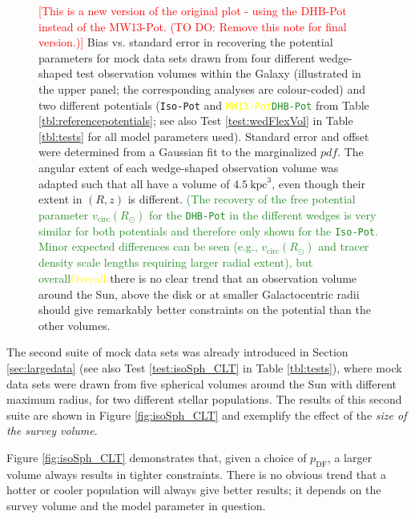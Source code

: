 \documentclass[iop,revtex4,numberedappendix,appendixfloats]{emulateapj}
\newcommand{\pdf}{\ensuremath{pdf}}
\newcommand{\NEW}[1]{\textcolor{ForestGreen}{#1}}
\newcommand{\OLD}[1]{\textcolor{Yellow}{#1}}%
\newcommand{\NOTE}[1]{\textcolor{Red}{#1}}
\begin{document}
\begin{figure}[!htbp]
\caption{\NOTE{[This is a new version of the original plot - using the DHB-Pot instead of the MW13-Pot. (TO DO: Remove this note for final version.)]} Bias vs. standard error in recovering the potential parameters for mock data sets drawn from four different wedge-shaped test observation volumes within the Galaxy (illustrated in the upper panel; the corresponding analyses are colour-coded) and two different potentials (\texttt{Iso-Pot} and \OLD{\texttt{MW13-Pot}}\NEW{\texttt{DHB-Pot}} from Table \ref{tbl:referencepotentials}; see also Test \ref{test:wedFlexVol} in Table \ref{tbl:tests} for all model parameters used). Standard error and offset were determined from a Gaussian fit to the marginalized \pdf{}. The angular extent of each wedge-shaped observation volume was adapted such that all have a volume of $4.5~\text{kpc}^3$, even though their extent in $(R,z)$ is different. \NEW{(The recovery of the free potential parameter $v_\text{circ}(R_\odot)$ for the \texttt{DHB-Pot} in the different wedges is very similar for both potentials and therefore only shown for the \texttt{Iso-Pot}. Minor expected differences can be seen (e.g., $v_\text{circ}(R_\odot)$ and tracer density scale lengths requiring larger radial extent), but overall}\OLD{Overall} there is no clear trend that an observation volume around the Sun, above the disk or at smaller Galactocentric radii should give remarkably better constraints on the potential than the other volumes.}
\label{fig:wedFlexVol_bias_vs_SE}
\end{figure}

The second suite of mock data sets was already introduced in Section \ref{sec:largedata} (see also Test \ref{test:isoSph_CLT} in Table \ref{tbl:tests}), where mock data sets were drawn from five spherical volumes around the Sun with different maximum radius, for two different stellar populations. The results of this second suite are shown in Figure \ref{fig:isoSph_CLT} and exemplify the effect of the {\it size of the survey volume}.

Figure \ref{fig:isoSph_CLT} demonstrates that, given a choice of $p_\text{DF}$, a larger volume always results in tighter constraints. There is no obvious trend that a hotter or cooler population will always give better results; it depends on the survey volume and the model parameter in question.
\end{document}
